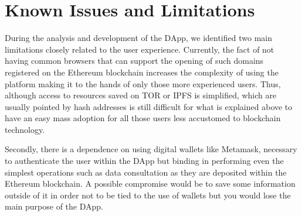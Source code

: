 \documentclass[main.tex]{subfiles}
\begin{document}
\section{Known Issues and Limitations}\label{sec:known-issues-and-limitations}

During the analysis and development of the DApp, we identified two main limitations closely related to the user experience. 
Currently, the fact of not having common browsers that can support the opening of such domains registered on the Ethereum blockchain increases the complexity of using the platform making it to the hands of only those more experienced users.
Thus, although access to resources saved on TOR or IPFS is simplified, which are usually pointed by hash addresses is still difficult for what is explained above to have an easy mass adoption for all those users less accustomed to blockchain technology.

Secondly, there is a dependence on using digital wallets like Metamask, necessary to authenticate the user within the DApp but binding in performing even the simplest operations such as data consultation as they are deposited within the Ethereum blockchain. A possible compromise would be to save some information outside of it in order not to be tied to the use of wallets but you would lose the main purpose of the DApp.
\end{document}
